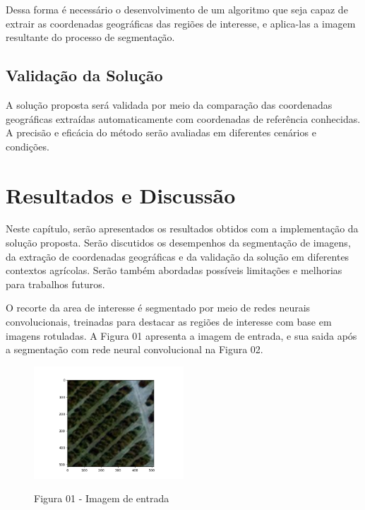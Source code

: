 \documentclass[conference]{IEEEtran}
\begin{document}
Dessa forma é necessário o desenvolvimento de um algoritmo que seja capaz de extrair as coordenadas 
geográficas das regiões de interesse, e aplica-las a imagem resultante do processo de segmentação.


\subsection{Validação da Solução}
A solução proposta será validada por meio da comparação das coordenadas geográficas extraídas 
automaticamente com coordenadas de referência conhecidas. A precisão e eficácia do método serão 
avaliadas em diferentes cenários e condições.

\section{Resultados e Discussão}
Neste capítulo, serão apresentados os resultados obtidos com a implementação da solução proposta. 
Serão discutidos os desempenhos da segmentação de imagens, da extração de coordenadas 
geográficas e da validação da solução em diferentes contextos agrícolas. 
Serão também abordadas possíveis limitações e melhorias para trabalhos futuros.

O recorte da area de interesse é segmentado por meio de redes neurais convolucionais, treinadas para destacar 
as regiões de interesse com base em imagens rotuladas. A Figura 01 apresenta a imagem de entrada, e sua saida
após a segmentação com rede neural convolucional na Figura 02.

\begin{figure}
    \centering
    \caption{Figura 01 - Imagem de entrada}
    \includegraphics[width=0.5\textwidth]{images/01.png}
    \label{fig:01}
\end{figure}
\end{document}
